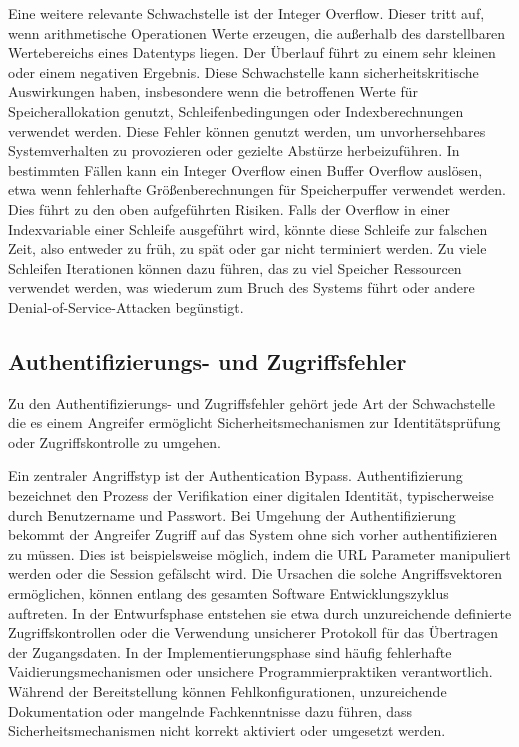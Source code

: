 	Eine weitere relevante Schwachstelle ist der Integer Overflow. 
	Dieser tritt auf, wenn arithmetische Operationen Werte erzeugen, die außerhalb des darstellbaren Wertebereichs eines
	Datentyps liegen.
	Der Überlauf führt zu einem sehr kleinen oder einem negativen Ergebnis.
	Diese Schwachstelle kann sicherheitskritische Auswirkungen haben, 
	insbesondere wenn die betroffenen Werte für Speicherallokation genutzt, Schleifenbedingungen oder Indexberechnungen verwendet werden. 
	Diese Fehler können genutzt werden, um unvorhersehbares Systemverhalten zu provozieren oder gezielte Abstürze herbeizuführen.
	In bestimmten Fällen kann ein Integer Overflow einen Buffer Overflow auslösen, etwa wenn fehlerhafte 
	Größenberechnungen für Speicherpuffer verwendet werden.
	Dies führt zu den oben aufgeführten Risiken. 
	Falls der Overflow in einer Indexvariable einer Schleife ausgeführt wird,
	könnte diese Schleife zur falschen Zeit, also entweder zu früh, zu spät oder 
	gar nicht terminiert werden. Zu viele Schleifen Iterationen können dazu führen, das zu viel Speicher Ressourcen 
	verwendet werden, was wiederum zum Bruch des Systems führt oder andere Denial-of-Service-Attacken begünstigt. 
	\cite{cwecwe190integer, cwecwe119improper, smashingstackfun}

	\subsection{Authentifizierungs- und Zugriffsfehler}
	Zu den Authentifizierungs- und Zugriffsfehler gehört jede Art der Schwachstelle die es einem 
	Angreifer ermöglicht Sicherheitsmechanismen zur Identitätsprüfung oder Zugriffskontrolle
	zu umgehen.
	
	Ein zentraler Angriffstyp ist der Authentication Bypass.
	Authentifizierung bezeichnet den Prozess der Verifikation einer digitalen Identität, typischerweise durch
	Benutzername und Passwort. Bei Umgehung der Authentifizierung bekommt der Angreifer Zugriff auf das System
	ohne sich vorher authentifizieren zu müssen.
	Dies ist beispielsweise möglich, indem die URL Parameter manipuliert werden oder die
	Session gefälscht wird. 
	Die Ursachen die solche Angriffsvektoren ermöglichen, können entlang des gesamten Software Entwicklungszyklus auftreten. 
	In der Entwurfsphase entstehen sie etwa durch unzureichende definierte Zugriffskontrollen oder
	die Verwendung  unsicherer Protokoll für das Übertragen der Zugangsdaten.
	In der Implementierungsphase sind häufig fehlerhafte Vaidierungsmechanismen
	oder unsichere Programmierpraktiken verantwortlich.
	Während der Bereitstellung können Fehlkonfigurationen, unzureichende Dokumentation oder mangelnde 
	Fachkenntnisse dazu führen, dass Sicherheitsmechanismen nicht korrekt aktiviert oder umgesetzt werden.
	
